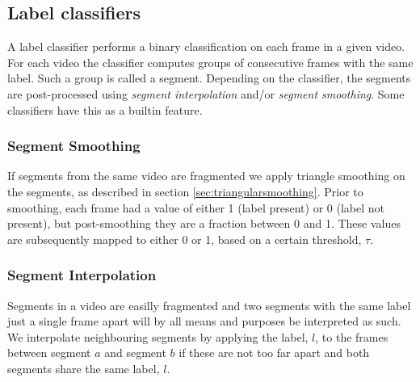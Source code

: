 \subsection{Label classifiers}
%
A label classifier performs a binary classification on each frame in a given video. For each video the classifier computes groups of consecutive frames with the same label. Such a group is called a segment. Depending on the classifier, the segments are post-processed using \textit{segment interpolation} and/or \textit{segment smoothing}. Some classifiers have this as a builtin feature.
%
\subsubsection{Segment Smoothing}\label{sec:labelsmooth}
%
If segments from the same video are fragmented we apply triangle smoothing on the segments, as described in section \ref{sec:triangularsmoothing}. Prior to smoothing, each frame had a value of either 1 (label present) or 0 (label not present), but post-smoothing they are a fraction between 0 and 1. These values are subsequently mapped to either 0 or 1, based on a certain threshold, $\tau$.
%
\subsubsection{Segment Interpolation}\label{sec:labelmerge}
%
Segments in a video are easilly fragmented and two segments with the same label just a single frame apart will by all means and purposes be interpreted as such. We interpolate neighbouring segments by applying the label, $l$, to the frames between segment $a$ and segment $b$ if these are not too far apart and both segments share the same label, $l$.
%
